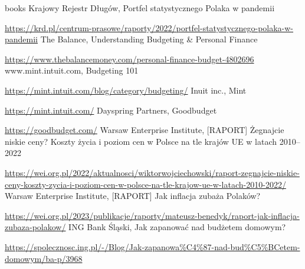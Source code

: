 \documentclass[a4paper,10pt, twoside]{report}
\begin{document}
\begin{thebibliography} {books}
     Krajowy Rejestr Długów, Portfel statystycznego Polaka w pandemii \raggedright\url{
        https://krd.pl/centrum-prasowe/raporty/2022/portfel-statystycznego-polaka-w-pandemii}
     The Balance, Understanding Budgeting \& Personal Finance\raggedright\url{
        https://www.thebalancemoney.com/personal-finance-budget-4802696}
     www.mint.intuit.com, Budgeting 101 \raggedright\url{
        https://mint.intuit.com/blog/category/budgeting/}
     Inuit inc., Mint \raggedright\url{
        https://mint.intuit.com/}
     Dayspring Partners, Goodbudget \raggedright\url{
        https://goodbudget.com/}
     Warsaw Enterprise Institute, [RAPORT] Żegnajcie niskie ceny? Koszty życia i poziom cen w Polsce na tle krajów UE w latach 2010–2022 \raggedright\url{
        https://wei.org.pl/2022/aktualnosci/wiktorwojciechowski/raport-zegnajcie-niskie-ceny-koszty-zycia-i-poziom-cen-w-polsce-na-tle-krajow-ue-w-latach-2010-2022/}
     Warsaw Enterprise Institute, [RAPORT] Jak inflacja zubaża Polaków? \raggedright\url{
        https://wei.org.pl/2023/publikacje/raporty/mateusz-benedyk/raport-jak-inflacja-zubaza-polakow/}
     ING Bank Śląski, Jak zapanować nad budżetem domowym? \raggedright\url{
        https://spolecznosc.ing.pl/-/Blog/Jak-zapanowa\%C4\%87-nad-bud\%C5\%BCetem-domowym/ba-p/3968}
        
\end{thebibliography}

\listoffigures
\listoftables
\lstlistoflistings
\end{document}
